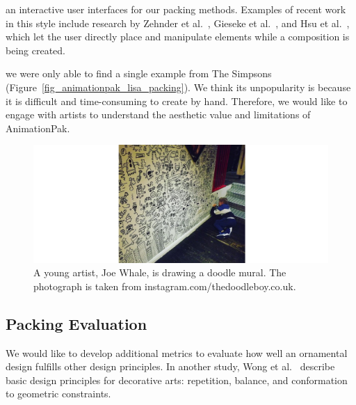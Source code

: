  an interactive user interfaces for our packing methods.
Examples of recent work in this style include research
by Zehnder et al.~\cite{Zehnder2016}, Gieseke et al.~\cite{Gieseke2017}, 
and Hsu et al.~\cite{Hsu2020}, which let the user directly place and manipulate
elements while a composition is being created.

we were only able to find a single example from The Simpsons (Figure~\ref{fig_animationpak_lisa_packing}). 
We think its unpopularity is because it is difficult and time-consuming to create by hand.
Therefore, we would like to engage with artists to understand the aesthetic value and limitations
of AnimationPak.


\begin{figure}
\centering
\includegraphics[width=1.0\textwidth]{figures/conclusions/doodle_boy.pdf}
\caption[A doodle mural by Joe Whale]
{ \label{doodle_boy} 
\nnewtext
{
A young artist, Joe Whale, is drawing a doodle mural. 
The photograph is taken from instagram.com/thedoodleboy.co.uk.
}
}
\end{figure}

\subsection{Packing Evaluation}

We would like to develop additional metrics to evaluate
how well an ornamental design fulfills other design principles.
In another study, Wong et al.~\cite{Wong1998} describe basic design
principles for decorative arts: repetition, balance, and conformation
to geometric constraints. 

